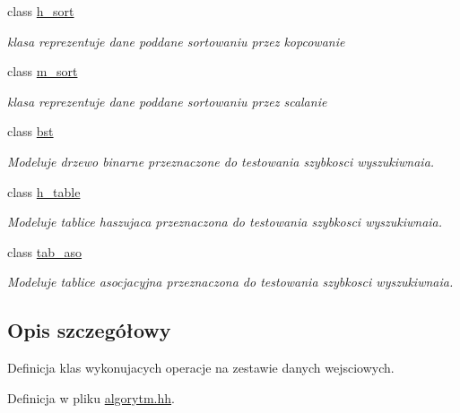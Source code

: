 \begin{DoxyCompactItemize}
class \hyperlink{classh__sort}{h\-\_\-sort}
\begin{DoxyCompactList}\small\item\em klasa reprezentuje dane poddane sortowaniu przez kopcowanie \end{DoxyCompactList}\item 
class \hyperlink{classm__sort}{m\-\_\-sort}
\begin{DoxyCompactList}\small\item\em klasa reprezentuje dane poddane sortowaniu przez scalanie \end{DoxyCompactList}\item 
class \hyperlink{classbst}{bst}
\begin{DoxyCompactList}\small\item\em \-Modeluje drzewo binarne przeznaczone do testowania szybkosci wyszukiwnaia. \end{DoxyCompactList}\item 
class \hyperlink{classh__table}{h\-\_\-table}
\begin{DoxyCompactList}\small\item\em \-Modeluje tablice haszujaca przeznaczona do testowania szybkosci wyszukiwnaia. \end{DoxyCompactList}\item 
class \hyperlink{classtab__aso}{tab\-\_\-aso}
\begin{DoxyCompactList}\small\item\em \-Modeluje tablice asocjacyjna przeznaczona do testowania szybkosci wyszukiwnaia. \end{DoxyCompactList}\end{DoxyCompactItemize}


\subsection{\-Opis szczegółowy}
\-Definicja klas wykonujacych operacje na zestawie danych wejsciowych. 

\-Definicja w pliku \hyperlink{algorytm_8hh_source}{algorytm.\-hh}.


